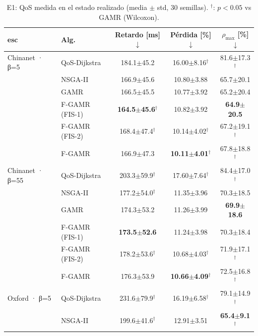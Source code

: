 \begin{table}[t]
\centering
\scriptsize
\caption{E1: QoS medida en el estado realizado (media $\pm$ std, 30 semillas). $^\dagger$: $p<0.05$ vs GAMR (Wilcoxon).}
\label{tab:e1qos}
\setlength{\tabcolsep}{2.5pt}
\begin{tabular}{llccc}
\toprule
esc & Alg. & Retardo [ms] $\downarrow$ & Pérdida [\%] $\downarrow$ & $\rho_{\max}$ [\%] $\downarrow$ \\
\midrule
Chinanet · β=5%
 & QoS-Dijkstra & 184.1$\pm$45.2 & 16.00$\pm$8.16$^\dagger$ & 81.6$\pm$17.3$^\dagger$ \\
 & NSGA-II & 166.9$\pm$45.6 & 10.80$\pm$3.88 & 65.7$\pm$20.1 \\
 & GAMR & 166.5$\pm$45.5 & 10.77$\pm$3.92 & 65.2$\pm$20.4 \\
 & F-GAMR (FIS-1) & \textbf{164.5$\pm$45.6}$^\dagger$ & 10.82$\pm$3.92 & \textbf{64.9$\pm$20.5} \\
 & F-GAMR (FIS-2) & 168.4$\pm$47.4$^\dagger$ & 10.14$\pm$4.02$^\dagger$ & 67.2$\pm$19.1$^\dagger$ \\
 & F-GAMR & 166.9$\pm$47.3 & \textbf{10.11$\pm$4.01}$^\dagger$ & 67.8$\pm$18.8$^\dagger$ \\
\midrule
Chinanet · β=55%
 & QoS-Dijkstra & 203.3$\pm$59.9$^\dagger$ & 17.60$\pm$7.64$^\dagger$ & 84.4$\pm$17.0$^\dagger$ \\
 & NSGA-II & 177.2$\pm$54.0$^\dagger$ & 11.35$\pm$3.96 & 70.3$\pm$18.5 \\
 & GAMR & 174.3$\pm$53.2 & 11.26$\pm$3.99 & \textbf{69.9$\pm$18.6} \\
 & F-GAMR (FIS-1) & \textbf{173.5$\pm$52.6} & 11.24$\pm$3.98 & 70.3$\pm$18.4 \\
 & F-GAMR (FIS-2) & 178.2$\pm$53.6$^\dagger$ & 10.68$\pm$4.03$^\dagger$ & 71.9$\pm$17.1$^\dagger$ \\
 & F-GAMR & 176.3$\pm$53.9 & \textbf{10.66$\pm$4.09}$^\dagger$ & 72.5$\pm$16.8$^\dagger$ \\
\midrule
Oxford · β=5%
 & QoS-Dijkstra & 231.6$\pm$79.9$^\dagger$ & 16.19$\pm$6.58$^\dagger$ & 79.1$\pm$14.9$^\dagger$ \\
 & NSGA-II & 199.6$\pm$41.6$^\dagger$ & 12.91$\pm$3.51 & \textbf{65.4$\pm$9.1}$^\dagger$ \\

\end{tabular}
\end{table}
